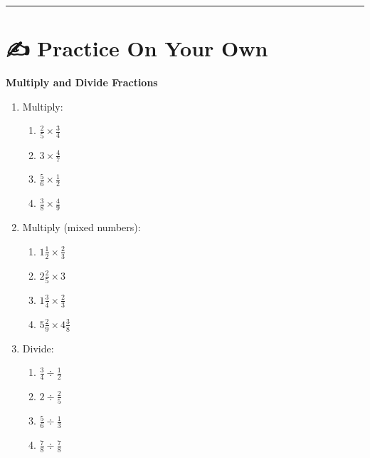 \documentclass[
  letterpaper,
  DIV=11,
  numbers=noendperiod]{scrreprt}
\providecommand{\tightlist}{%
  \setlength{\itemsep}{0pt}\setlength{\parskip}{0pt}}
\begin{document}
\begin{center}\rule{0.5\linewidth}{0.5pt}\end{center}

\section*{✍️ Practice On Your Own}\label{practice-on-your-own-4}


\textbf{Multiply and Divide Fractions}

\begin{enumerate}
\def\labelenumi{\arabic{enumi}.}
\item
  Multiply:

  \begin{enumerate}
  \def\labelenumii{\alph{enumii}.}
  \tightlist
  \item
    \(\frac{2}{5} \times \frac{3}{4}\)\\
  \item
    \(3 \times \frac{4}{7}\)\\
  \item
    \(\frac{5}{6} \times \frac{1}{2}\)\\
  \item
    \(\frac{3}{8} \times \frac{4}{9}\)
  \end{enumerate}
\item
  Multiply (mixed numbers):

  \begin{enumerate}
  \def\labelenumii{\alph{enumii}.}
  \tightlist
  \item
    \(1\tfrac{1}{2} \times \frac{2}{3}\)\\
  \item
    \(2\tfrac{2}{5} \times 3\)\\
  \item
    \(1\tfrac{3}{4} \times \frac{2}{3}\)\\
  \item
    \(5\tfrac{2}{9} \times 4\tfrac{3}{8}\)
  \end{enumerate}
\item
  Divide:

  \begin{enumerate}
  \def\labelenumii{\alph{enumii}.}
  \tightlist
  \item
    \(\frac{3}{4} \div \frac{1}{2}\)\\
  \item
    \(2 \div \frac{2}{5}\)\\
  \item
    \(\frac{5}{6} \div \frac{1}{3}\)\\
  \item
    \(\frac{7}{8} \div \frac{7}{8}\)
  \end{enumerate}
\end{enumerate}
\end{document}
